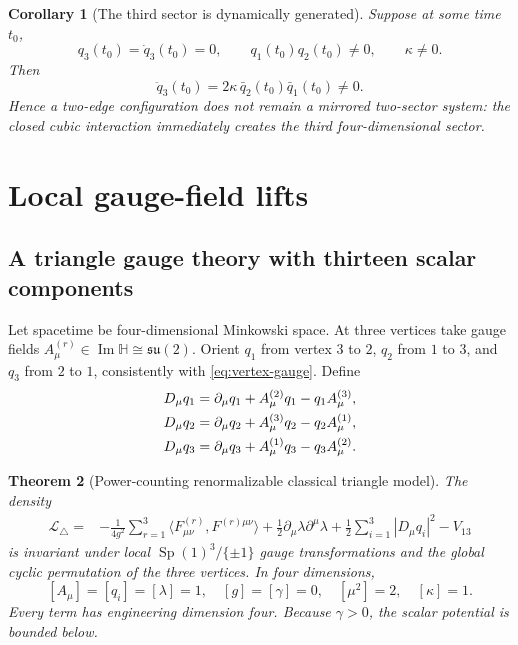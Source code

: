 \documentclass[11pt]{article}
\newtheorem{theorem}{Theorem}[section]
\newtheorem{corollary}[theorem]{Corollary}
\theoremstyle{definition}
\theoremstyle{remark}
\newcommand{\Hh}{\mathbb H}
\newcommand{\Sp}{\operatorname{Sp}}
\begin{document}
\begin{corollary}[The third sector is dynamically generated]\label{cor:third-generated}
Suppose at some time $t_0$,
\[
 q_3(t_0)=\dot q_3(t_0)=0,
 \qquad q_1(t_0)q_2(t_0)\neq0,
 \qquad\kappa\neq0.
\]
Then
\begin{equation}\label{eq:q3-source}
 \boxed{
 \ddot q_3(t_0)=2\kappa\,\bar q_2(t_0)\bar q_1(t_0)\neq0.}
\end{equation}
Hence a two-edge configuration does not remain a mirrored two-sector system: the closed cubic interaction immediately creates the third four-dimensional sector.
\end{corollary}

\section{Local gauge-field lifts}

\subsection{A triangle gauge theory with thirteen scalar components}

Let spacetime be four-dimensional Minkowski space.  At three vertices take gauge fields
$A_\mu^{(r)}\in\operatorname{Im}\Hh\cong\mathfrak{su}(2)$.  Orient $q_1$ from vertex $3$ to $2$, $q_2$ from $1$ to $3$, and $q_3$ from $2$ to $1$, consistently with \eqref{eq:vertex-gauge}.  Define
\begin{align}\label{eq:covariant-edges}
 D_\mu q_1&=\partial_\mu q_1+A_\mu^{(2)}q_1-q_1A_\mu^{(3)},\notag\\
 D_\mu q_2&=\partial_\mu q_2+A_\mu^{(3)}q_2-q_2A_\mu^{(1)},\\
 D_\mu q_3&=\partial_\mu q_3+A_\mu^{(1)}q_3-q_3A_\mu^{(2)}.\notag
\end{align}

\begin{theorem}[Power-counting renormalizable classical triangle model]\label{thm:triangle-QFT}
The density
\begin{align}\label{eq:triangle-Lagrangian}
 \mathcal L_\triangle
 =&-\frac1{4g^2}\sum_{r=1}^3\langle F_{\mu\nu}^{(r)},F^{(r)\mu\nu}\rangle
 +\frac12\partial_\mu\lambda\partial^\mu\lambda
 +\frac12\sum_{i=1}^3|D_\mu q_i|^2
 -V_{13}
\end{align}
is invariant under local $\Sp(1)^3/\{\pm1\}$ gauge transformations and the global cyclic permutation of the three vertices.  In four dimensions,
\[
 [A_\mu]=[q_i]=[\lambda]=1,
 \quad[g]=[\gamma]=0,
 \quad[\mu^2]=2,
 \quad[\kappa]=1.
\]
Every term has engineering dimension four.  Because $\gamma>0$, the scalar potential is bounded below.
\end{theorem}
\end{document}
